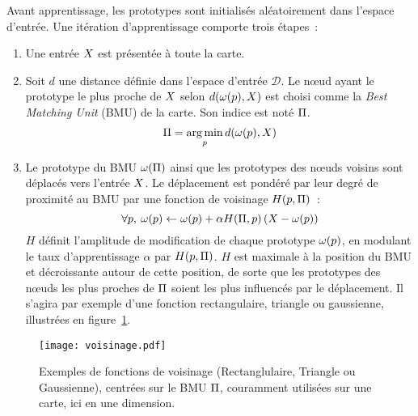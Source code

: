 \documentclass[../main]{subfiles}
\begin{document}
Avant apprentissage, les prototypes sont initialisés aléatoirement dans l'espace d'entrée.
Une itération d'apprentissage comporte trois étapes~:
\begin{enumerate}
\item Une entrée $X$ est présentée à toute la carte.
\item Soit $d$ une distance définie dans l'espace d'entrée $\mathcal{D}$. Le n\oe{}ud ayant le prototype le plus proche de $X$ selon $d(\omega(p), X)$ est choisi comme la \emph{Best Matching Unit} (BMU) de la carte. Son indice est noté $\Pi$.
\begin{equation}
    \Pi = \operatorname*{arg\,min}\limits_p d(\omega(p),X)
\end{equation}
\item Le prototype du BMU $\omega(\Pi)$ ainsi que les prototypes des n\oe{}uds voisins sont déplacés vers l'entrée $X$. Le déplacement est pondéré par leur degré de proximité au BMU par une fonction de voisinage $H(p,\Pi)$~:
\begin{equation} \forall p, \:\omega(p) \leftarrow \omega(p) + \alpha H(\Pi,p) \left( X - \omega(p)\right) \end{equation}
$H$ définit l'amplitude de modification de chaque prototype $\omega(p)$, en modulant le taux d'apprentissage $\alpha$ par $H(p,\Pi)$. $H$ est maximale à la position du BMU et décroissante autour de cette position, de sorte que les prototypes des n\oe{}uds les plus proches de $\Pi$ soient les plus influencés par le déplacement. Il s'agira par exemple d'une fonction rectangulaire, triangle ou gaussienne, illustrées en figure~\ref{fig:h}.
\end{enumerate}

\begin{figure}
     \centering
     \texttt{[image: voisinage.pdf]}
     \caption{Exemples de fonctions de voisinage (Rectanglulaire, Triangle ou Gaussienne), centrées sur le BMU $\Pi$, couramment utilisées sur une carte, ici en une dimension.\label{fig:h}}
\end{figure}
\end{document}

